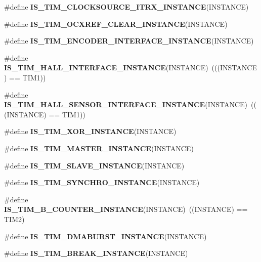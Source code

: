 \begin{DoxyCompactItemize}
\item 
\#define {\bfseries I\+S\+\_\+\+T\+I\+M\+\_\+\+C\+L\+O\+C\+K\+S\+O\+U\+R\+C\+E\+\_\+\+I\+T\+R\+X\+\_\+\+I\+N\+S\+T\+A\+N\+CE}(I\+N\+S\+T\+A\+N\+CE)
\item 
\#define {\bfseries I\+S\+\_\+\+T\+I\+M\+\_\+\+O\+C\+X\+R\+E\+F\+\_\+\+C\+L\+E\+A\+R\+\_\+\+I\+N\+S\+T\+A\+N\+CE}(I\+N\+S\+T\+A\+N\+CE)
\item 
\#define {\bfseries I\+S\+\_\+\+T\+I\+M\+\_\+\+E\+N\+C\+O\+D\+E\+R\+\_\+\+I\+N\+T\+E\+R\+F\+A\+C\+E\+\_\+\+I\+N\+S\+T\+A\+N\+CE}(I\+N\+S\+T\+A\+N\+CE)
\item 
\mbox{\label{group___exported__macro_gacdcc047699e2d83c9d2b3a3f8375dff4}} 
\#define {\bfseries I\+S\+\_\+\+T\+I\+M\+\_\+\+H\+A\+L\+L\+\_\+\+I\+N\+T\+E\+R\+F\+A\+C\+E\+\_\+\+I\+N\+S\+T\+A\+N\+CE}(I\+N\+S\+T\+A\+N\+CE)~(((I\+N\+S\+T\+A\+N\+CE) == T\+I\+M1))
\item 
\mbox{\label{group___exported__macro_ga979ea18ba0931f5ed15cc2f3ac84794b}} 
\#define {\bfseries I\+S\+\_\+\+T\+I\+M\+\_\+\+H\+A\+L\+L\+\_\+\+S\+E\+N\+S\+O\+R\+\_\+\+I\+N\+T\+E\+R\+F\+A\+C\+E\+\_\+\+I\+N\+S\+T\+A\+N\+CE}(I\+N\+S\+T\+A\+N\+CE)~(((I\+N\+S\+T\+A\+N\+CE) == T\+I\+M1))
\item 
\#define {\bfseries I\+S\+\_\+\+T\+I\+M\+\_\+\+X\+O\+R\+\_\+\+I\+N\+S\+T\+A\+N\+CE}(I\+N\+S\+T\+A\+N\+CE)
\item 
\#define {\bfseries I\+S\+\_\+\+T\+I\+M\+\_\+\+M\+A\+S\+T\+E\+R\+\_\+\+I\+N\+S\+T\+A\+N\+CE}(I\+N\+S\+T\+A\+N\+CE)
\item 
\#define {\bfseries I\+S\+\_\+\+T\+I\+M\+\_\+\+S\+L\+A\+V\+E\+\_\+\+I\+N\+S\+T\+A\+N\+CE}(I\+N\+S\+T\+A\+N\+CE)
\item 
\#define {\bfseries I\+S\+\_\+\+T\+I\+M\+\_\+\+S\+Y\+N\+C\+H\+R\+O\+\_\+\+I\+N\+S\+T\+A\+N\+CE}(I\+N\+S\+T\+A\+N\+CE)
\item 
\mbox{\label{group___exported__macro_gac41867bf288927ff8ff10a85e67a591b}} 
\#define {\bfseries I\+S\+\_\+\+T\+I\+M\+\_\+B\+\_\+\+C\+O\+U\+N\+T\+E\+R\+\_\+\+I\+N\+S\+T\+A\+N\+CE}(I\+N\+S\+T\+A\+N\+CE)~((I\+N\+S\+T\+A\+N\+CE) == T\+I\+M2)
\item 
\#define {\bfseries I\+S\+\_\+\+T\+I\+M\+\_\+\+D\+M\+A\+B\+U\+R\+S\+T\+\_\+\+I\+N\+S\+T\+A\+N\+CE}(I\+N\+S\+T\+A\+N\+CE)
\item 
\#define {\bfseries I\+S\+\_\+\+T\+I\+M\+\_\+\+B\+R\+E\+A\+K\+\_\+\+I\+N\+S\+T\+A\+N\+CE}(I\+N\+S\+T\+A\+N\+CE)

\end{DoxyCompactItemize}
